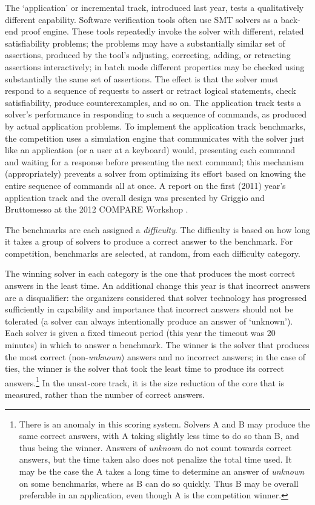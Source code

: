 \documentclass{llncs}
\begin{document}
The `application' or incremental track, introduced last year, tests a qualitatively different capability. Software verification tools often use SMT solvers as a back-end proof engine. These tools repeatedly invoke the solver with different, related satisfiability problems; the problems may have a substantially similar set of assertions, produced by the tool's adjusting, correcting, adding, or retracting assertions interactively; in batch mode different properties may be checked using substantially the same set of assertions.
The effect is that the solver must respond to a sequence of requests to assert or retract logical statements, check satisfiability, produce counterexamples, and so on. The application track tests a solver's performance in responding to such a sequence of commands, as produced by actual application problems. To implement the application track benchmarks, the 
competition uses a simulation engine that communicates with the solver just like an application (or a user at a keyboard) would, presenting each command and waiting for a response before presenting the next command; this mechanism (appropriately) prevents a solver from optimizing its effort based on knowing the entire sequence of commands all at once. A report
on the first (2011) year's application track and the overall design was presented by Griggio and Bruttomesso at the 
2012 COMPARE Workshop \cite{ag+rb+12}.

The benchmarks are each assigned a {\em difficulty}. The difficulty is based on how long it takes a group of solvers to produce a correct answer to the benchmark. For competition, benchmarks are selected, at random, from each difficulty category. 

The winning solver in each category is the one that produces the most correct answers in the least time. An additional change this year is that incorrect answers are a disqualifier: the organizers considered that solver technology has progressed sufficiently in capability and importance that incorrect answers should not be tolerated (a solver can always intentionally produce an answer of `unknown'). Each solver is given a fixed timeout period (this year the timeout was 20 minutes) in which to answer a benchmark. The winner is the solver that produces the most correct (non-{\em unknown}) answers and no incorrect answers; in the case of ties, the winner is the solver that took the least time to produce its correct answers.\footnote{There is an anomaly in this scoring system. Solvers A and B may produce the same correct answers, with A taking slightly less time to do so than B, and thus being the winner. Answers of {\em unknown} do not count towards correct answers, but the time taken also does not penalize the total time used. It may be the case the A takes a long time to determine an answer of {\em unknown} on some benchmarks, where as B can do so quickly. Thus B may be overall preferable in an application, even though A is the competition winner.}
In the unsat-core track, it is the size reduction of the core that is measured, rather than the number of correct answers.
\end{document}
